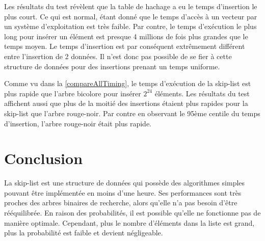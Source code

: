\documentclass[hidelinks,a4paper, 12pt]{article}
\begin{document}
	Les résultats du test révèlent que la table de hachage a eu le temps d'insertion le plus court. Ce qui est normal, étant donné que le temps d'accès à un vecteur par un système d'exploitation est très faible. Par contre, le temps d'exécution le plus long pour insérer un élément est presque 4 millions de fois plus grandes que le temps moyen. Le temps d'insertion est par conséquent extrêmement différent entre l'insertion de 2 données. Il n'est donc pas possible de se fier à cette structure de données pour des insertions prenant un temps uniforme.
	
	Comme vu dans la \cref{compareAllTiming}, le temps d'exécution de la skip-list est plus rapide que l'arbre bicolore pour insérer $2^{24}$ éléments. Les résultats du test affichent aussi que plus de la moitié des insertions étaient plus rapides pour la skip-list que l'arbre rouge-noir. Par contre en observant le 95ème centile du temps d'insertion, l'arbre rouge-noir était plus rapide.
	
	\begin{table}[h]
		\caption{Différence entre les temps d'insertion}
		\label{deltaTiming}
	\end{table}
	
	\section{Conclusion}
	La skip-list est une structure de données qui possède des algorithmes simples pouvant être implémentée en moins d'une heure. Ses performances sont très proches des arbres binaires de recherche, alors qu'elle n'a pas besoin d'être rééquilibrée. En raison des probabilités, il est possible qu'elle ne fonctionne pas de manière optimale. Cependant, plus le nombre d'éléments dans la liste est grand, plus la probabilité est faible et devient négligeable.
	
\end{document}
